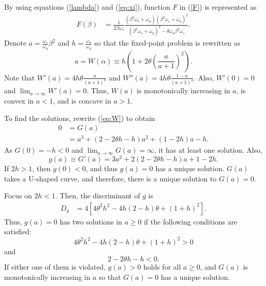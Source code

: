 
By using equations (\ref{lambda}) and (\ref{eq:xi}), function $F$ in (\ref{F}) is represented as
\begin{align*}
F(\beta) & =\frac{1}{2\beta\omega_{s}}\frac{(\beta^{2}\omega_{s}+\omega_{u})(\beta^{2}\omega_{s}+\omega_{\eta})^{2}}{(\beta^{2}\omega_{s}+\omega_{\eta})^{2}-\theta\omega_{u}\beta^{2}\omega_{s}}.
\end{align*}
Denote $a=\frac{\omega_{s}}{\omega_{\eta}}\beta^{2}$ and $h=\frac{\omega_{u}}{\omega_{\eta}}$ 
so that the fixed-point problem is rewritten as 
\begin{equation}
a=W(\alpha)\equiv h\left(1+2\theta\left(\frac{a}{a+1}\right)^{2}\right).\label{eq:W}
\end{equation}
Note that $W'(a)=4h\theta\frac{a}{(a+1)^{3}}$ and $W''(a)=4h\theta\frac{1-a}{(a+1)^{4}}$. Also, $W'(0)=0$ and $\lim_{a\rightarrow\infty}W'(a)=0$. Thus, $W(a)$ is monotonically increasing in $a$, is convex in $a<1$, and is concave in $a>1$. 

To find the solutions, rewrite (\ref{eq:W}) to obtain 
\begin{align}
0 & =G(a)\nonumber \\
 & =a^{3}+(2-2\theta h-h)a^{2}+(1-2h)a-h.\label{eq:G}
\end{align}
As $G(0)=-h<0$ and $\lim_{a\rightarrow\infty}G(a)=\infty$, it has at least one solution. Also,
\[
g(a)\equiv G'(a)=3a^{2}+2(2-2\theta h-h)a+1-2h.
\]
If $2h>1$, then $g(0)<0$, and thus $g(a)=0$ has a unique solution. $G(a)$ takes a U-shaped curve, and therefore, there is a unique solution to $G(a)=0$.

Focus on $2h<1$. Then, the discriminant of $g$ is
\begin{align*}
D_{g} & =4\left[4\theta^{2}h^{2}-4h(2-h)\theta+(1+h)^{2}\right].
\end{align*}
Thus, $g(a)=0$ has two solutions in $a\ge0$ if the following conditions are satisfied:
\begin{equation}
4\theta^{2}h^{2}-4h(2-h)\theta+(1+h)^{2}>0\label{eq:cond1}
\end{equation}
 and 
\begin{equation}
2-2\theta h-h<0.\label{eq:cond2}
\end{equation}
If either one of them is violated, $g(a)>0$ holds for all $a\ge0$, and $G(a)$ is monotonically increasing in $a$ so that $G(a)=0$ has a unique solution. 

